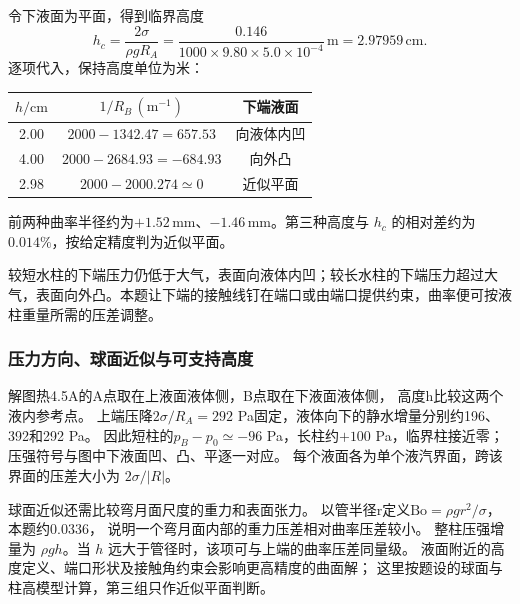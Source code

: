 \documentclass[UTF8,fontset=fandol,a4paper,11pt]{ctexart}
\begin{document}
令下液面为平面，得到临界高度
\[
h_c=\frac{2\sigma}{\rho gR_A}
=\frac{0.146}{1000\times9.80\times5.0\times10^{-4}}\,\mathrm m
=2.97959\,\mathrm{cm}.
\]
逐项代入，保持高度单位为米：
\begin{center}\begin{tabular}{ccc}\toprule $h/\mathrm{cm}$ & $1/R_B\,(\mathrm{m^{-1}})$ & 下端液面\\\midrule
2.00 & $2000-1342.47=657.53$ & 向液体内凹\\
4.00 & $2000-2684.93=-684.93$ & 向外凸\\
2.98 & $2000-2000.274\simeq0$ & 近似平面\\\bottomrule\end{tabular}\end{center}
前两种曲率半径约为$+1.52\,\mathrm{mm}$、$-1.46\,\mathrm{mm}$。第三种高度与 $h_c$ 的相对差约为 $0.014\%$，按给定精度判为近似平面。

较短水柱的下端压力仍低于大气，表面向液体内凹；较长水柱的下端压力超过大气，表面向外凸。本题让下端的接触线钉在端口或由端口提供约束，曲率便可按液柱重量所需的压差调整。
\subsubsection*{压力方向、球面近似与可支持高度}
解图热4.5A的A点取在上液面液体侧，B点取在下液面液体侧，
高度h比较这两个液内参考点。
上端压降$2\sigma/R_A=292$ Pa固定，液体向下的静水增量分别约196、392和292 Pa。
因此短柱的$p_B-p_0\simeq-96$ Pa，长柱约$+100$ Pa，临界柱接近零；
压强符号与图中下液面凹、凸、平逐一对应。
每个液面各为单个液汽界面，跨该界面的压差大小为 $2\sigma/|R|$。

球面近似还需比较弯月面尺度的重力和表面张力。
以管半径r定义$\mathrm{Bo}=\rho gr^2/\sigma$，本题约0.0336，
说明一个弯月面内部的重力压差相对曲率压差较小。
整柱压强增量为 $\rho gh$。当 $h$ 远大于管径时，该项可与上端的曲率压差同量级。
液面附近的高度定义、端口形状及接触角约束会影响更高精度的曲面解；
这里按题设的球面与柱高模型计算，第三组只作近似平面判断。
\end{document}
